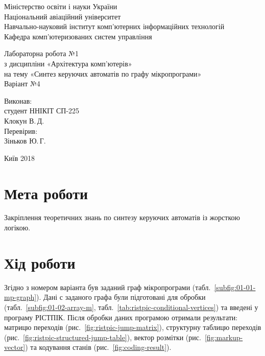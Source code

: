 \documentclass[a4paper,oneside,DIV=12,12pt]{scrartcl}
\newcommand{\allcaps}[1]{{\addfontfeatures{LetterSpace = 3}#1}}
\begin{document}
	\begin{titlepage}
	\centering
		Міністерство освіти і науки України\\
		Національний авіаційний університет\\
		Навчально-науковий інститут комп'ютерних інформаційних технологій\\
		Кафедра комп'ютеризованих систем управління

		\vspace*{\fill}

		Лабораторна робота №1\\
		з дисципліни «Архітектура комп'ютерів»\\
		на тему «Синтез керуючих автоматів по графу мікропрограми»\\
		Варіант №4

		\vspace*{\fill}
		
		\begin{flushright}
			Виконав:\\
			студент ННІКІТ СП-225\\
			Клокун В.\,Д.\\
			Перевірив:\\
			Зіньков Ю.\,Г.
		\end{flushright}

		Київ 2018
    \end{titlepage}
	
	\section{Мета роботи}
		Закріплення теоретичних знань по синтезу керуючих автоматів із жорсткою логікою.
		
	\section{Хід роботи}
		Згідно з номером варіанта був заданий граф мікропрограми (табл.~\ref{subfig:01-01-mp-graph}). Дані с заданого графа були підготовані для обробки (табл.~\ref{subfig:01-02-array-m}, табл.~\ref{tab:ristpic-conditional-vertices}) та введені у програму \allcaps{РІСТПІК}. Після обробки даних програмою отримали результати: матрицю переходів (рис.~\ref{fig:ristpic-jump-matrix}), структурну таблицю переходів (рис.~\ref{fig:ristpic-structured-jump-table}), вектор розмітки (рис.~\ref{fig:markup-vector}) та кодування станів (рис.~\ref{fig:coding-result}).
		
\end{document}
